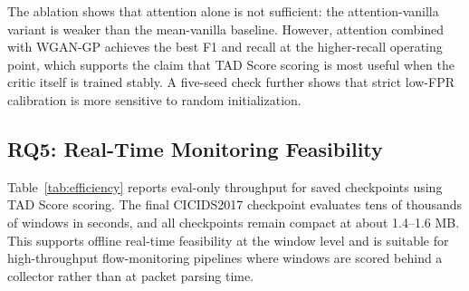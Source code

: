 \documentclass[conference]{IEEEtran}
\newcommand{\model}{TCN-WGAN-GP with TAD Scoring}
\newcommand{\tad}{TAD Score}
\begin{document}
The ablation shows that attention alone is not sufficient: the attention-vanilla variant is weaker than the mean-vanilla baseline. However, attention combined with WGAN-GP achieves the best F1 and recall at the higher-recall operating point, which supports the claim that \tad{} scoring is most useful when the critic itself is trained stably. A five-seed check further shows that strict low-FPR calibration is more sensitive to random initialization.
\FloatBarrier

\subsection{RQ5: Real-Time Monitoring Feasibility}
\begin{table}[!t]
  \centering
  \caption{Inference efficiency of \model{} checkpoints.}
  \label{tab:efficiency}
  \small
  \setlength{\tabcolsep}{3.0pt}
\end{table}

Table~\ref{tab:efficiency} reports eval-only throughput for saved checkpoints using \tad{} scoring. The final CICIDS2017 checkpoint evaluates tens of thousands of windows in seconds, and all checkpoints remain compact at about 1.4--1.6 MB. This supports offline real-time feasibility at the window level and is suitable for high-throughput flow-monitoring pipelines where windows are scored behind a collector rather than at packet parsing time.

\begin{table}[!t]
  \centering
  \caption{Lightweight Gaussian-noise robustness on 12,000 sampled CICIDS2017 test windows. The threshold is calibrated on clean benign windows at target FPR 0.05.}
  \label{tab:noise-robustness}
  \small
  \setlength{\tabcolsep}{3.0pt}
\end{table}
\end{document}
